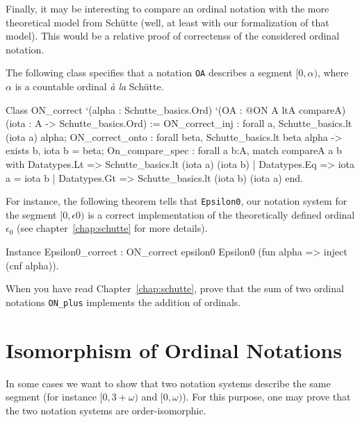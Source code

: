 Finally, it may be interesting to compare an ordinal notation with the more theoretical model from Schütte (well, at least with our formalization of that model). This would be a relative proof of correctenss of the considered  ordinal  notation.

The following class specifies that a notation \texttt{OA} describes a segment $[0,\alpha)$,
where $\alpha$ is a countable ordinal \emph{à la}  Schütte.


\label{types:ON-for}

\begin{Coqsrc}
Class ON_correct `(alpha : Schutte_basics.Ord)
     `(OA : @ON A ltA  compareA)
      (iota : A -> Schutte_basics.Ord) :=
  { ON_correct_inj : forall a, Schutte_basics.lt (iota a) alpha;
    ON_correct_onto : forall beta, Schutte_basics.lt beta alpha ->
                                exists b, iota b = beta;
    On_compare_spec : forall a b:A,
        match compareA a b with
          Datatypes.Lt => Schutte_basics.lt (iota a) (iota b)
        | Datatypes.Eq => iota a = iota b
        | Datatypes.Gt => Schutte_basics.lt (iota b) (iota a)
        end}.
\end{Coqsrc}



For instance, the following theorem tells that \texttt{Epsilon0}, our notation system for the segment $[0,\epsilon0)$ is a correct implementation of the theoretically defined  ordinal $\epsilon_0$
(see chapter~\ref{chap:schutte} for more details).


\begin{Coqsrc}
Instance Epsilon0_correct :
  ON_correct epsilon0 Epsilon0  (fun alpha => inject (cnf alpha)).
\end{Coqsrc}


\begin{project}
  When you have read Chapter~\ref{chap:schutte}, prove that the sum of two ordinal notations \texttt{ON\_plus} implements the addition of ordinals.
\end{project}





\section{Isomorphism of Ordinal Notations}


In some cases we want to show that two notation systems describe the same segment (for instance $[0,3+\omega)$ and $[0,\omega)$\;). For this purpose, one may prove that the two notation systems are order-isomorphic.


